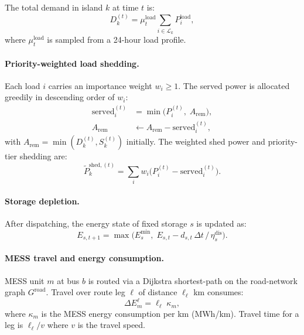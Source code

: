 The total demand in island $k$ at time $t$ is:
\begin{equation}
  D_k^{(t)} = \mu_t^{\text{load}} \sum_{i\in\mathcal{L}_k} P_i^{\text{load}},
  \label{eq:res-demand}
\end{equation}
where $\mu_t^{\text{load}}$ is sampled from a 24-hour load profile.

\paragraph{Priority-weighted load shedding.}
Each load $i$ carries an importance weight $w_i \geq 1$.
The served power is allocated greedily in descending order of $w_i$:
\begin{align}
  \text{served}_i^{(t)} &= \min\!\bigl(P_i^{(t)},\; A_{\text{rem}}\bigr),
    \label{eq:res-served}\\
  A_{\text{rem}} &\leftarrow A_{\text{rem}} - \text{served}_i^{(t)},
\end{align}
with $A_{\text{rem}} = \min(D_k^{(t)}, S_k^{(t)})$ initially.
The weighted shed power and priority-tier shedding are:
\begin{equation}
  \widetilde{P}_k^{\text{shed},(t)}
    = \sum_i w_i\bigl(P_i^{(t)} - \text{served}_i^{(t)}\bigr).
  \label{eq:res-weighted-shed}
\end{equation}

\paragraph{Storage depletion.}
After dispatching, the energy state of fixed storage $s$ is updated as:
\begin{equation}
  E_{s,t+1} = \max\!\bigl(E_s^{\min},\;
    E_{s,t} - d_{s,t}\,\Delta t\,/\,\eta_s^{\text{dis}}\bigr).
  \label{eq:res-storage-soc}
\end{equation}

\paragraph{MESS travel and energy consumption.}
MESS unit $m$ at bus $b$ is routed via a Dijkstra shortest-path on the
road-network graph $G^{\text{road}}$.  Travel over route leg $\ell$ of
distance $\ell_\ell$ km consumes:
\begin{equation}
  \Delta E_m^\ell = \ell_\ell\;\kappa_m,
  \label{eq:res-mess-energy}
\end{equation}
where $\kappa_m$ is the MESS energy consumption per km (MWh/km).
Travel time for a leg is $\ell_\ell / v$ where $v$ is the travel speed.

